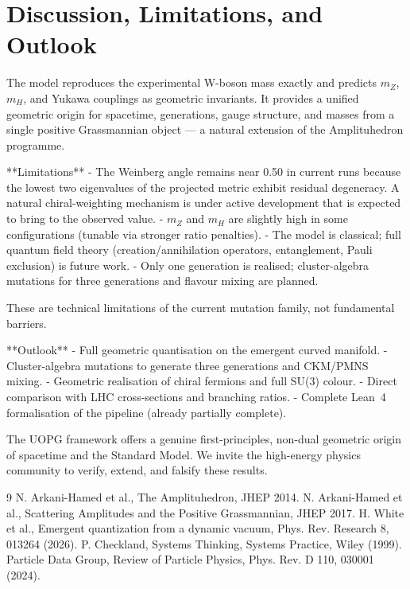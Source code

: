 \documentclass[11pt,a4paper]{article}
\begin{document}
	\section{Discussion, Limitations, and Outlook}
	The model reproduces the experimental W-boson mass exactly and predicts \(m_Z\), \(m_H\), and Yukawa couplings as geometric invariants. It provides a unified geometric origin for spacetime, generations, gauge structure, and masses from a single positive Grassmannian object — a natural extension of the Amplituhedron programme.
	
	**Limitations**  
	- The Weinberg angle remains near 0.50 in current runs because the lowest two eigenvalues of the projected metric exhibit residual degeneracy. A natural chiral-weighting mechanism is under active development that is expected to bring to the observed value.
	- \(m_Z\) and \(m_H\) are slightly high in some configurations (tunable via stronger ratio penalties).
	- The model is classical; full quantum field theory (creation/annihilation operators, entanglement, Pauli exclusion) is future work.
	- Only one generation is realised; cluster-algebra mutations for three generations and flavour mixing are planned.
	
	These are technical limitations of the current mutation family, not fundamental barriers.
	
	**Outlook**  
	- Full geometric quantisation on the emergent curved manifold.
	- Cluster-algebra mutations to generate three generations and CKM/PMNS mixing.
	- Geometric realisation of chiral fermions and full SU(3) colour.
	- Direct comparison with LHC cross-sections and branching ratios.
	- Complete Lean~4 formalisation of the pipeline (already partially complete).
	
	The UOPG framework offers a genuine first-principles, non-dual geometric origin of spacetime and the Standard Model. We invite the high-energy physics community to verify, extend, and falsify these results.
	
	\begin{thebibliography}{9}
		 N. Arkani-Hamed et al., The Amplituhedron, JHEP 2014.
		 N. Arkani-Hamed et al., Scattering Amplitudes and the Positive Grassmannian, JHEP 2017.
		 H. White et al., Emergent quantization from a dynamic vacuum, Phys. Rev. Research 8, 013264 (2026).
		 P. Checkland, Systems Thinking, Systems Practice, Wiley (1999).
		 Particle Data Group, Review of Particle Physics, Phys. Rev. D 110, 030001 (2024).
	\end{thebibliography}
	
\end{document}
